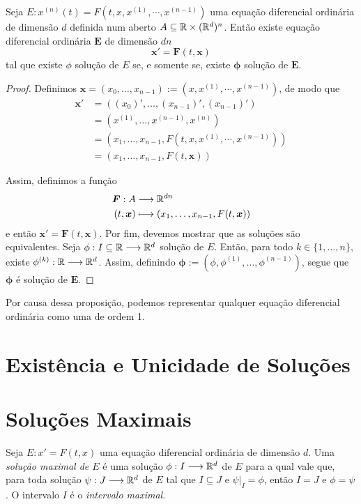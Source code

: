 \begin{prop}
	Seja $E: x^{(n)}(t) = F(t, x, x^{(1)}, \cdots,x^{(n-1)})$ uma equação diferencial ordinária de dimensão $d$ definida num aberto $A \subseteq \mathbb{R} \times (\mathbb{R}^d)^n$. Então existe equação diferencial ordinária $\bm E$ de dimensão $dn$
	\begin{equation*}
	 \bm x' = \bm F(t,\bm x)
	\end{equation*}	
tal que existe $\phi$ solução de $E$ se, e somente se, existe $\bm \phi$ solução de $\bm E$.
\end{prop}
\begin{proof}
	Definimos $\bm x = (x_0, \ldots,x_{n-1}) := (x,x^{(1)}, \cdots,x^{(n-1)})$, de modo que
	\begin{align*}
	\bm x' &= ((x_0)',\ldots,(x_{n-1})',(x_{n-1})') \\
			&= (x^{(1)}, \ldots,x^{(n-1)},x^{(n)}) \\
			&= (x_1,\ldots,x_{n-1},F(t, x, x^{(1)}, \cdots,x^{(n-1)})) \\
			&= (x_1,\ldots,x_{n-1},F(t,\bm x))
	\end{align*}	

	Assim, definimos a função
	\begin{align*}
	{\bm F}: {A} &\longrightarrow {\mathbb{R}^{dn}} \\{(t,\bm x)} &\longmapsto {(x_1,\ldots,x_{n-1},F(t, \bm x))}
	\end{align*}
e então $\bm x' = \bm F(t,\bm x)$. Por fim, devemos mostrar que as soluções são equivalentes. Seja $\phi: I \subseteq \mathbb{R} \longrightarrow \mathbb{R}^d$ solução de $E$. Então, para todo $k \in \{1,\ldots,n\}$, existe $\phi^{(k)}: \mathbb{R} \longrightarrow \mathbb{R}^d$. Assim, definindo $\bm \phi := (\phi,\phi^{(1)},\ldots,\phi^{(n-1)})$, segue que $\bm \phi$ é solução de $\bm E$.
\end{proof}

Por causa dessa proposição, podemos representar qualquer equação diferencial ordinária como uma de ordem 1.

\section{Existência e Unicidade de Soluções}



\section{Soluções Maximais}

\begin{defi}
	Seja $E: x'=F(t,x)$ uma equação diferencial ordinária de dimensão $d$. Uma \emph{solução maximal de $E$} é uma solução $\phi: I \longrightarrow \mathbb{R}^d$ de $E$ para a qual vale que, para toda solução $\psi: J \longrightarrow \mathbb{R}^d$ de $E$ tal que $I \subseteq J$ e $\psi|_I = \phi$, então $I = J$ e $\phi = \psi$. O intervalo $I$ é o \emph{intervalo maximal}.
\end{defi}

